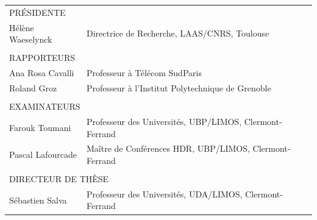 \begin{titlepage}
    \begin{tabular}{l l}
    \multicolumn{2}{l}{\uppercase{Présidente}}\\
    Hélène Waeselynck & Directrice de Recherche, LAAS/CNRS, Toulouse\\
    & \\
    \multicolumn{2}{l}{\uppercase{Rapporteurs}}\\
    Ana Rosa Cavalli & Professeur à Télécom SudParis\\
    Roland Groz & Professeur à l'Institut Polytechnique de Grenoble\\
    & \\
    \multicolumn{2}{l}{\uppercase{Examinateurs}}\\
    Farouk Toumani & Professeur des Universités, UBP/LIMOS, Clermont-Ferrand\\
    Pascal Lafourcade & Maître de Conférences HDR, UBP/LIMOS, Clermont-Ferrand\\
    & \\
    \multicolumn{2}{l}{\uppercase{Directeur de thèse}}\\
    S\'ebastien Salva & Professeur des Universités, UDA/LIMOS, Clermont-Ferrand\\
    \end{tabular}

\end{titlepage}
